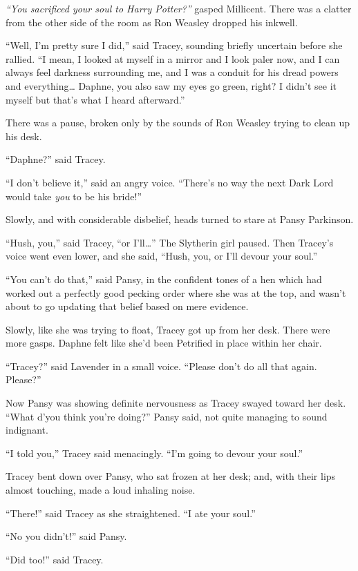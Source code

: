 \emph{``You sacrificed your soul to Harry Potter?''} gasped Millicent.
There was a clatter from the other side of the room as Ron Weasley
dropped his inkwell.

``Well, I'm pretty sure I did,'' said Tracey, sounding briefly uncertain
before she rallied. ``I mean, I looked at myself in a mirror and I look
paler now, and I can always feel darkness surrounding me, and I was a
conduit for his dread powers and everything\ldots{} Daphne, you also saw
my eyes go green, right? I didn't see it myself but that's what I heard
afterward.''

There was a pause, broken only by the sounds of Ron Weasley trying to
clean up his desk.

``Daphne?'' said Tracey.

``I don't believe it,'' said an angry voice. ``There's no way the next
Dark Lord would take \emph{you} to be his bride!''

Slowly, and with considerable disbelief, heads turned to stare at Pansy
Parkinson.

``Hush, you,'' said Tracey, ``or I'll\ldots{}'' The Slytherin girl
paused. Then Tracey's voice went even lower, and she said, ``Hush, you,
or I'll devour your soul.''

``You can't do that,'' said Pansy, in the confident tones of a hen which
had worked out a perfectly good pecking order where she was at the top,
and wasn't about to go updating that belief based on mere evidence.

Slowly, like she was trying to float, Tracey got up from her desk. There
were more gasps. Daphne felt like she'd been Petrified in place within
her chair.

``Tracey?'' said Lavender in a small voice. ``Please don't do all that
again. Please?''

Now Pansy was showing definite nervousness as Tracey swayed toward her
desk. ``What d'you think you're doing?'' Pansy said, not quite managing
to sound indignant.

``I told you,'' Tracey said menacingly. ``I'm going to devour your
soul.''

Tracey bent down over Pansy, who sat frozen at her desk; and, with their
lips almost touching, made a loud inhaling noise.

``There!'' said Tracey as she straightened. ``I ate your soul.''

``No you didn't!'' said Pansy.

``Did too!'' said Tracey.

